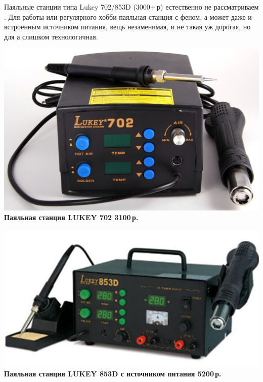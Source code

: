\documentclass{magazine}
\begin{document}
{Паяльные станции типа Lukey 702/853D (3000+\,р) естественно не рассматриваем
\smiley. Для работы или регулярного хобби паяльная станция с феном, а может даже
и встроенным источником питания, вещь незаменимая, и не такая уж дорогая, но для
\scr а слишком технологичная.

\noindent\href{http://voltmaster-samara.ru/catalog/product/00073444/}{
\includegraphics[width=\columnwidth]{fig/00/Lukey702.jpg}}
\textbf{Паяльная станция LUKEY 702 3100\,р.}

\noindent\href{http://shop.siriust.ru/product\_info.php/cPath/23\_28\_269/products\_id/15290}{
\includegraphics[width=\columnwidth]{fig/00/Lukey853D.jpg}}
\textbf{Паяльная станция LUKEY 853D с источником питания 5200\,р.}


}
\end{document}

